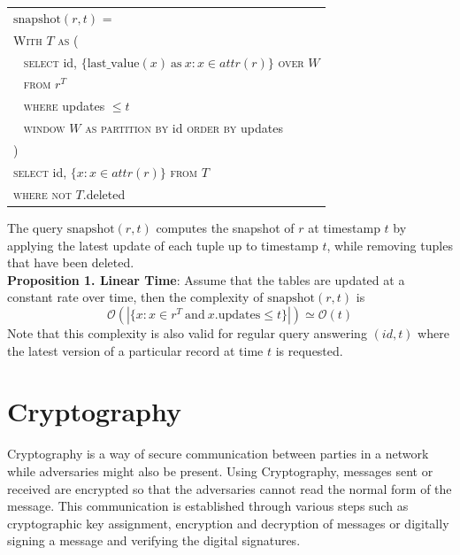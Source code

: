     \vspace{1em}
\begin{center}

{\small
	\begin{tabular}{|l|} \hline
		$\mathrm{snapshot}(r, t)$ = \\
		\verb|| \textsc{With} $T$ \textsc{as} ( \\
		\verb| | \textsc{select} id, $\{\mathrm{last\_value}(x) \mathrm{\ as\ } x:
		x\in attr(r)\}$ \textsc{over} $W$ \\
		\verb| | \textsc{from} $r^T$ \\
		\verb| | \textsc{where} updates $\leq t$ \\
		\verb| | \textsc{window} $W$ \textsc{as} 
		\textsc{partition by} id \textsc{order by} updates\\
		\verb|| ) \\
		\verb|| \textsc{select} id, $\{x: x\in attr(r)\}$ \textsc{from} $T$ \\
		\verb|| \textsc{where not} $T.$deleted \\ \hline
	\end{tabular}
}
\end{center}

The query $\mathrm{snapshot}(r, t)$ computes the snapshot of $r$ at timestamp
$t$ by applying the latest update of each tuple up to timestamp $t$, while
removing tuples that have been deleted.\\
\textbf{Proposition 1. Linear Time}: Assume that the tables are updated at a constant rate over time,
then the complexity of $\mathrm{snapshot}(r, t)$ is 
$$\mathcal{O}(|\{x: x\in r^T\mathrm{\ and\ } x.\mathrm{updates} \leq t\}|)
\simeq \mathcal{O}(t)$$
Note that this complexity is also valid for regular query answering $(id,t)$ where the latest version of a particular record at time $t$ is requested.


\section{Cryptography}
Cryptography is a way of secure communication between parties in a network while adversaries might also be present. Using Cryptography, messages sent or received are encrypted so that the adversaries cannot read the normal form of the message. This communication is established through various steps such as cryptographic key assignment, encryption and decryption of messages or digitally signing a message and verifying the digital signatures.


